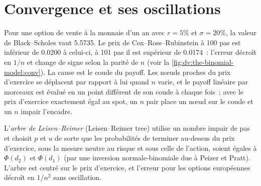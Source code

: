 \begin{omfigure}

\label{fig:dv:the-binomial-model:terminal}
\end{omfigure}

\section{Convergence et ses oscillations}

Pour une option de vente à la monnaie d'un an avec $r=5\%$ et $\sigma=20\%$, la valeur de Black--Scholes
vaut 5.5735. Le prix de Cox--Ross--Rubinstein à 100 pas est inférieur de 0.0200
à celui-ci, à 101 pas il est supérieur de 0.0174~: l'erreur décroît en $1/n$ et change de signe
selon la parité de $n$ (voir la \cref{fig:dv:the-binomial-model:conv}). La cause est le
coude du payoff. Les nœuds proches du prix d'exercice se déplacent par rapport à lui quand $n$ varie,
et le payoff linéaire par morceaux est évalué en un point différent de son coude
à chaque fois~; avec le prix d'exercice exactement égal au spot, un $n$ pair place un nœud sur le coude
et un $n$ impair l'encadre.

\begin{definition}\label{def:dv:the-binomial-model:lr}
L'\emph{arbre de Leisen--Reimer} (Leisen--Reimer tree) utilise un nombre impair de
pas et choisit $p$ et $u$ de sorte que les probabilités de terminer au-dessus
du prix d'exercice, sous la mesure neutre au risque et sous celle de l'action, soient égales à $\Phi(d_2)$ et
$\Phi(d_1)$ (par une inversion normale-binomiale due à Peizer et Pratt).
L'arbre est centré sur le prix d'exercice, et l'erreur pour les options européennes décroît
en $1/n^2$ sans oscillation.
\end{definition}

